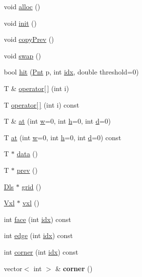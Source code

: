 \begin{DoxyCompactItemize}
\item 
void \hyperlink{classvsr_1_1_lattice_ac4484f3f67b5d0b842263c4735a09548}{alloc} ()
\item 
void \hyperlink{classvsr_1_1_lattice_a9c70f331ac4bf55b130caec17eeb670d}{init} ()
\item 
void \hyperlink{classvsr_1_1_lattice_aa35efc7f6311788357984828007b0d64}{copy\-Prev} ()
\item 
void \hyperlink{classvsr_1_1_lattice_a64c3fbe61526e6a9979fa5a7c051e784}{swap} ()
\item 
bool \hyperlink{classvsr_1_1_lattice_a4aa6212d4c145407baaff3d334f9dbad}{hit} (\hyperlink{namespacevsr_a2d05beb9721c5d9211b479af6d47222d}{Pnt} p, int \hyperlink{classvsr_1_1_lattice_adb69198162bacf492faea0ceff8e497c}{idx}, double threshold=0)
\item 
T \& \hyperlink{classvsr_1_1_lattice_a713a2a74610b9ee71f03621c6b40f4d3}{operator\mbox{[}$\,$\mbox{]}} (int i)
\item 
T \hyperlink{classvsr_1_1_lattice_a77a93f29e2934c6ba7685945a87f3207}{operator\mbox{[}$\,$\mbox{]}} (int i) const 
\item 
T \& \hyperlink{classvsr_1_1_lattice_a65c8068054299ed33f37d21961edd670}{at} (int \hyperlink{classvsr_1_1_lattice_ae377e62dbbed1f950bd900c34b30fb89}{w}=0, int \hyperlink{classvsr_1_1_lattice_a51b0756a11687bb9f69f886ed90ff68a}{h}=0, int \hyperlink{classvsr_1_1_lattice_a5ee2e0d41d22764521a812a82074886b}{d}=0)
\item 
T \hyperlink{classvsr_1_1_lattice_a2649e8e22042ed3c2a9288ca0d986f8e}{at} (int \hyperlink{classvsr_1_1_lattice_ae377e62dbbed1f950bd900c34b30fb89}{w}=0, int \hyperlink{classvsr_1_1_lattice_a51b0756a11687bb9f69f886ed90ff68a}{h}=0, int \hyperlink{classvsr_1_1_lattice_a5ee2e0d41d22764521a812a82074886b}{d}=0) const 
\item 
T $\ast$ \hyperlink{classvsr_1_1_lattice_ac59d9a773db6eaca5875c270325ed407}{data} ()
\item 
T $\ast$ \hyperlink{classvsr_1_1_lattice_a830d2aba3ce988d1b8def73b52344625}{prev} ()
\item 
\hyperlink{classvsr_1_1_m_v}{Dls} $\ast$ \hyperlink{classvsr_1_1_lattice_a85532086719166cc74662088b0173a4c}{grid} ()
\item 
\hyperlink{classvsr_1_1_vxl}{Vxl} $\ast$ \hyperlink{classvsr_1_1_lattice_a24ec792827fe12954e7d9062009035b7}{vxl} ()
\item 
int \hyperlink{classvsr_1_1_lattice_a223ff135ed86d9d4f84fa64074e425a6}{face} (int \hyperlink{classvsr_1_1_lattice_adb69198162bacf492faea0ceff8e497c}{idx}) const 
\item 
int \hyperlink{classvsr_1_1_lattice_af895169622b0432aa4df2f89b6262b33}{edge} (int \hyperlink{classvsr_1_1_lattice_adb69198162bacf492faea0ceff8e497c}{idx}) const 
\item 
int \hyperlink{classvsr_1_1_lattice_afae2c7f07d3d6f7143526e38c4ee8968}{corner} (int \hyperlink{classvsr_1_1_lattice_adb69198162bacf492faea0ceff8e497c}{idx}) const 
\item 
\hypertarget{classvsr_1_1_lattice_a58ed8323156dd7126c6840cddfd763b6}{vector$<$ int $>$ \& {\bfseries corner} ()}\label{classvsr_1_1_lattice_a58ed8323156dd7126c6840cddfd763b6}


\end{DoxyCompactItemize}
